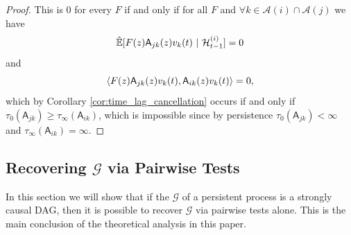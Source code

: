 \documentclass[12pt]{article}
\def\gcg{\mathcal{G}}  %
\def\A{\mathsf{A}}  %
\def\H{\mathcal{H}}  %
\newcommand{\linE}[2]{\hat{\E}[#1\ |\ #2]}  %
\newcommand{\anc}[1]{\mathcal{A}(#1)}  %
\begin{document}
\begin{proof}

  This is $0$ for every $F$ if and only if for all $F$ and
  $\forall k \in \anc{i} \cap \anc{j}$ we have
  $$\linE{F(z)\A_{jk}(z)v_k(t)}{\H_{t - 1}^{(i)}} = 0$$ and
  $$\inner{F(z)\A_{jk}(z)v_k(t)}{\A_{ik}(z)v_k(t)} = 0,$$ which by
  Corollary \ref{cor:time_lag_cancellation} occurs if and only if
  $\tau_0(\A_{jk}) \ge \tau_\infty(\A_{ik})$, which is impossible since by persistence
  $\tau_0(\A_{jk}) < \infty$ and  $\tau_\infty(\A_{ik}) = \infty$.
\end{proof}

\subsection{Recovering $\gcg$ via Pairwise Tests}
\label{sec:pairwise_algorithm}
In this section we will show that if the $\gcg$ of a persistent
process is a strongly causal DAG, then it is possible to recover
$\gcg$ via pairwise tests alone.  This is the main conclusion of the
theoretical analysis in this paper.

\end{document}
